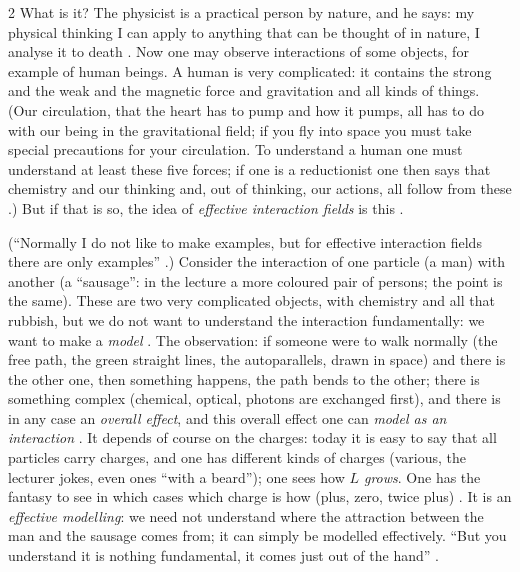 \begin{paracol}{2}
What is it? The physicist is a practical person by nature, and he says: my physical thinking I can apply to anything that can be thought of in nature, I analyse it to death . Now one may observe interactions of some objects, for example of human beings. A human is very complicated: it contains the strong and the weak and the
magnetic force and gravitation and all kinds of things. (Our circulation, that the heart has to pump and how it pumps, all has to do with our being in the gravitational field; if you fly into space you must take special precautions for your circulation. To understand a human one must understand at least these five forces; if one is a
reductionist one then says that chemistry and our thinking and, out of thinking, our actions, all follow from these .) But if that is so, the idea of \emph{effective interaction fields} is this .
\begin{example}\label{ex:nd-man}
(``Normally I do not like to make examples, but for effective interaction fields there are only examples'' .) Consider the interaction of one particle (a man) with another (a ``sausage'': in the lecture a more coloured pair of persons; the point is the same).
These are two very complicated objects, with chemistry and all that rubbish, but we do not want to understand the interaction fundamentally: we want to make a \emph{model} . The observation: if someone were to walk normally (the free path, the green straight lines, the autoparallels, drawn in space)
and there is the other one, then something happens, the path bends to the other; there is something complex (chemical, optical, photons are exchanged first), and there is in any case an \emph{overall effect}, and this overall effect one can \emph{model as an interaction} .
It depends of course on the charges: today it is easy to say that all particles carry charges, and one has different kinds of charges (various, the lecturer jokes, even ones ``with a beard''); one sees how \emph{$L$ grows}. One has the fantasy to see in which cases which charge is how (plus, zero, twice plus) .
It is an \emph{effective modelling}: we need not understand where the attraction between the man and the sausage comes from; it can simply be modelled effectively. ``But you understand it is nothing fundamental, it comes just out of the hand'' .
\end{example}
\begin{example}\label{ex:nd-hooke}

\end{example}
\end{paracol}
